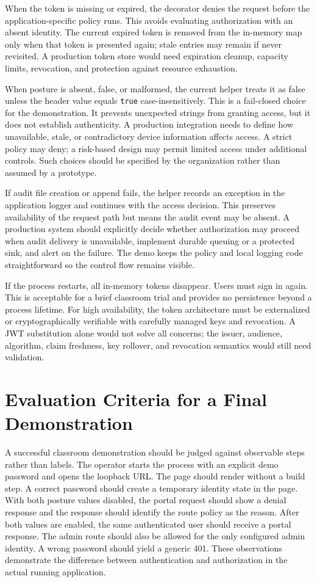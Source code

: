 When the token is missing or expired, the decorator denies the request before the application-specific policy runs. This avoids evaluating authorization with an absent identity. The current expired token is removed from the in-memory map only when that token is presented again; stale entries may remain if never revisited. A production token store would need expiration cleanup, capacity limits, revocation, and protection against resource exhaustion.

When posture is absent, false, or malformed, the current helper treats it as false unless the header value equals \texttt{true} case-insensitively. This is a fail-closed choice for the demonstration. It prevents unexpected strings from granting access, but it does not establish authenticity. A production integration needs to define how unavailable, stale, or contradictory device information affects access. A strict policy may deny; a risk-based design may permit limited access under additional controls. Such choices should be specified by the organization rather than assumed by a prototype.

If audit file creation or append fails, the helper records an exception in the application logger and continues with the access decision. This preserves availability of the request path but means the audit event may be absent. A production system should explicitly decide whether authorization may proceed when audit delivery is unavailable, implement durable queuing or a protected sink, and alert on the failure. The demo keeps the policy and local logging code straightforward so the control flow remains visible.

If the process restarts, all in-memory tokens disappear. Users must sign in again. This is acceptable for a brief classroom trial and provides no persistence beyond a process lifetime. For high availability, the token architecture must be externalized or cryptographically verifiable with carefully managed keys and revocation. A JWT substitution alone would not solve all concerns; the issuer, audience, algorithm, claim freshness, key rollover, and revocation semantics would still need validation.

\section{Evaluation Criteria for a Final Demonstration}
A successful classroom demonstration should be judged against observable steps rather than labels. The operator starts the process with an explicit demo password and opens the loopback URL. The page should render without a build step. A correct password should create a temporary identity state in the page. With both posture values disabled, the portal request should show a denial response and the response should identify the route policy as the reason. After both values are enabled, the same authenticated user should receive a portal response. The admin route should also be allowed for the only configured admin identity. A wrong password should yield a generic 401. These observations demonstrate the difference between authentication and authorization in the actual running application.

